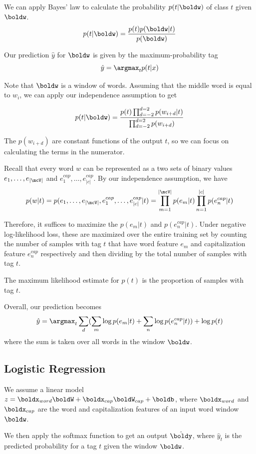 \documentclass[11pt]{article}
\begin{document}
We can apply Bayes' law to calculate the probability $p(t| \boldw)$ of class $t$ given $\boldw$. 
$$p(t| \boldw) = \frac{p(t)p(\boldw |t)}{p(\boldw)}$$

Our prediction $\hat{y}$ for $\boldw$ is given by the maximum-probability tag
$$\hat{y} = \argmax_{t} p(t | x)$$

Note that $\boldw$ is a window of words. Assuming that the middle word is equal to $w_i$, we can apply our independence assumption to get 

$$p(t | \boldw) = \frac{p(t)\prod_{d=-2}^{d=2} p(w_{i+d} | t)}{\prod_{d=-2}^{d=2} p(w_{i+d})}$$

The $p(w_{i+d})$ are constant functions of the output $t$, so we can focus on calculating the terms in the numerator. 

Recall that every word $w$ can be represented as a two sets of binary values $e_1, \dots, e_{|\mcV|}$ and $e^{cap}_1, \dots, e^{cap}_{|c|}$. By our independence assumption, we have 
$$p(w | t) = p(e_1, \dots, e_{|\mcV|}, e^{cap}_1, \dots, e^{cap}_{|c|} | t) = \prod_{m=1}^{|\mcV|} p(e_m | t) \prod_{n=1}^{|c|} p(e^{cap}_n | t)$$

Therefore, it suffices to maximize the $p(e_m | t)$ and $p(e^{cap}_n | t)$. Under negative log-likelihood loss, these are maximized over the entire training set by counting the number of samples with tag $t$ that have word feature $e_m$ and capitalization feature $e^{cap}_n$ respectively and then dividing by the total number of samples with tag $t$. 

The maximum likelihood estimate for $p(t)$ is the proportion of samples with tag $t$. 

Overall, our prediction becomes
$$\hat{y} = \argmax_t \sum_d (\sum_m \log p(e_m | t) + \sum_n \log p(e^{cap}_n | t)) + \log p(t)$$
where the sum is taken over all words in the window $\boldw$. 

\subsection{Logistic Regression}

We assume a linear model $z = \boldx_{word} \boldW + \boldx_{cap} \boldW_{cap} + \boldb$, where $\boldx_{word}$ and $\boldx_{cap}$ are the word and capitalization features of an input word window $\boldw$. 

We then apply the softmax function to get an output $\hat{\boldy}$, where $\hat{y}_t$ is the predicted probability for a tag $t$ given the window $\boldw$. 
\end{document}
